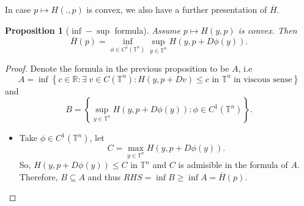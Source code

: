 \documentclass[12pt, oneside]{amsart}  	%
\newtheorem{proposition}{Proposition}
\begin{document}
In case $p\longmapsto H(.,p)$ is convex, we also have a further presentation of $\overline{H}$.
\begin{proposition}[$\inf-\sup$ formula]
Assume $p\mapsto H(y,p)$ is convex. Then
\begin{equation*}
\overline{H}(p)=\inf_{\phi\in C^1(\mathbb{T}^n)} \sup_{y\in \mathbb{T}^n} H(y, p+D\phi(y)).
\end{equation*}
\end{proposition}
\begin{proof} Denote the formula in the previous proposition to be $A$, i.e
\begin{equation*}
A = \inf \left\lbrace c\in \mathbb{R}:\exists\;v\in C(\mathbb{T}^n): H(y, p+Dv)\le c \text{ in }\mathbb{T}^n\;\text{in viscous sense} \right\rbrace
\end{equation*}
and
\begin{equation*}
B = \left\lbrace \sup_{y\in \mathbb{T}^n} H(y, p+D\phi(y)) : \phi\in C^1(\mathbb{T}^n) \right\rbrace.
\end{equation*}
\begin{itemize}
\item Take $\phi \in C^1(\mathbb{T}^n)$, let
\begin{equation*}
C=\max_{y\in \mathbb{T}^n} H(y, p + D\phi(y)).
\end{equation*}
So, $H(y, p+D\phi(y)) \le C$ in $\mathbb{T}^n$ and $C$ is admisible in the formula of $A$. Therefore, $B\subseteq A$ and thus
$RHS = \inf B\ge \inf A=\overline{H}(p)$. \\


\end{itemize}
\end{proof}
\end{document}
